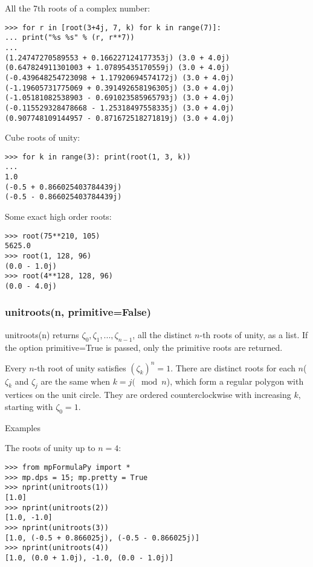 All the 7th roots of a complex number:
\begin{lstlisting}
>>> for r in [root(3+4j, 7, k) for k in range(7)]:
... print("%s %s" % (r, r**7))
...
(1.24747270589553 + 0.166227124177353j) (3.0 + 4.0j)
(0.647824911301003 + 1.07895435170559j) (3.0 + 4.0j)
(-0.439648254723098 + 1.17920694574172j) (3.0 + 4.0j)
(-1.19605731775069 + 0.391492658196305j) (3.0 + 4.0j)
(-1.05181082538903 - 0.691023585965793j) (3.0 + 4.0j)
(-0.115529328478668 - 1.25318497558335j) (3.0 + 4.0j)
(0.907748109144957 - 0.871672518271819j) (3.0 + 4.0j)
\end{lstlisting}


Cube roots of unity:
\begin{lstlisting}
>>> for k in range(3): print(root(1, 3, k))
...
1.0
(-0.5 + 0.866025403784439j)
(-0.5 - 0.866025403784439j)
\end{lstlisting}




Some exact high order roots:
\begin{lstlisting}
>>> root(75**210, 105)
5625.0
>>> root(1, 128, 96)
(0.0 - 1.0j)
>>> root(4**128, 128, 96)
(0.0 - 4.0j)
\end{lstlisting}



\subsubsection{unitroots(n, primitive=False)}
unitroots(n) returns $\zeta_0, \zeta_1,...,\zeta_{n-1}$, all the distinct $n$-th roots of unity, as a list. If the option primitive=True is passed, only the primitive roots are returned.

\vpara
Every $n$-th root of unity satisfies $(\zeta_k)^n=1$. There are distinct roots for each $n$($\zeta_k$ and $\zeta_j$ are the same when $k=j (\mod n$), which form a regular polygon with vertices on the unit circle. They are ordered counterclockwise with increasing $k$, starting with $\zeta_0=1$.

\vpara
Examples

The roots of unity up to $n=4$:
\begin{lstlisting}
>>> from mpFormulaPy import *
>>> mp.dps = 15; mp.pretty = True
>>> nprint(unitroots(1))
[1.0]
>>> nprint(unitroots(2))
[1.0, -1.0]
>>> nprint(unitroots(3))
[1.0, (-0.5 + 0.866025j), (-0.5 - 0.866025j)]
>>> nprint(unitroots(4))
[1.0, (0.0 + 1.0j), -1.0, (0.0 - 1.0j)]
\end{lstlisting}




